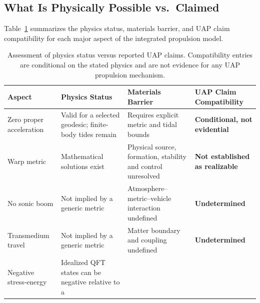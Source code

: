 \documentclass[aps,prd,twocolumn,superscriptaddress,nofootinbib,floatfix]{revtex4-2}
\begin{document}
\subsection{What Is Physically Possible vs.\ Claimed}\label{sec:possible-vs-claimed}

Table~\ref{tab:physics-vs-claims} summarizes the physics status, materials
barrier, and UAP claim compatibility for each major aspect of the integrated
propulsion model.

\begin{table}[t]
\caption{Assessment of physics status versus reported UAP claims. Compatibility
entries are conditional on the stated physics and are not evidence for any UAP
propulsion mechanism.}
\label{tab:physics-vs-claims}
\begin{tabular}{@{}llll@{}}
\toprule
\parbox[t]{0.17\textwidth}{\strut Aspect\strut} & \parbox[t]{0.27\textwidth}{\strut Physics Status\strut} & \parbox[t]{0.29\textwidth}{\strut Materials Barrier\strut} & \parbox[t]{0.19\textwidth}{\strut UAP Claim Compatibility\strut} \\
\midrule
\parbox[t]{0.17\textwidth}{\strut Zero proper acceleration\strut} & \parbox[t]{0.27\textwidth}{\strut Valid for a selected geodesic; finite-body tides
  remain\strut} & \parbox[t]{0.29\textwidth}{\strut Requires explicit metric and tidal bounds\strut} & \parbox[t]{0.19\textwidth}{\strut \textbf{Conditional, not
  evidential}\strut} \\
\parbox[t]{0.17\textwidth}{\strut Warp metric\strut} & \parbox[t]{0.27\textwidth}{\strut Mathematical solutions exist\strut} & \parbox[t]{0.29\textwidth}{\strut Physical source, formation,
  stability and control unresolved\strut} & \parbox[t]{0.19\textwidth}{\strut \textbf{Not established as realizable}\strut} \\
\parbox[t]{0.17\textwidth}{\strut No sonic boom\strut} & \parbox[t]{0.27\textwidth}{\strut Not implied by a generic metric\strut} & \parbox[t]{0.29\textwidth}{\strut Atmosphere--metric--vehicle
  interaction undefined\strut} & \parbox[t]{0.19\textwidth}{\strut \textbf{Undetermined}\strut} \\
\parbox[t]{0.17\textwidth}{\strut Transmedium travel\strut} & \parbox[t]{0.27\textwidth}{\strut Not implied by a generic metric\strut} & \parbox[t]{0.29\textwidth}{\strut Matter boundary and
  coupling undefined\strut} & \parbox[t]{0.19\textwidth}{\strut \textbf{Undetermined}\strut} \\
\parbox[t]{0.17\textwidth}{\strut Negative stress-energy\strut} & \parbox[t]{0.27\textwidth}{\strut Idealized QFT states can be negative relative to a
}
\end{tabular}
\end{table}
\end{document}
